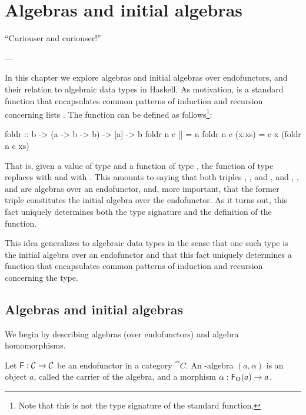 \chapter{Algebras and initial algebras}
\label{chap:algebras}

\epigraph{
  ``Curiouser and curiouser!''
}{---\textcite[23]{carroll-2004}}

In this chapter we explore algebras and initial algebras over
endofunctors, and their relation to algebraic data types in Haskell.
As motivation,  is a standard function that
encapsulates common patterns of induction and recursion concerning
lists \parencite[355--356]{hutton-1999}. The 
function can be defined as follows\footnote{Note that this is not the
  type signature of the standard  function.}:
\begin{codehaskell}
foldr :: b -> (a -> b -> b) -> [a] -> b
foldr n c []     = n
foldr n c (x:xs) = c x (foldr n c xs)
\end{codehaskell}
That is, given a value  of type  and a
function  of type , the
function  of type 
replaces \texthaskell{[]} with  and \texthaskell{(:)}
with . This amounts to saying that both triples
\texthaskell{[a]}, \texthaskell{[]}, and \texthaskell{(:)}, and
, , and  are algebras
over an endofunctor, and, more important, that the former triple
constitutes the initial algebra over the endofunctor. As it turns out,
this fact uniquely determines both the type signature and the
definition of the  function.

This idea generalizes to algebraic data types in the sense that one
such type is the initial algebra over an endofunctor and that this
fact uniquely determines a function that encapsulates common patterns
of induction and recursion concerning the type.

\section{Algebras and initial algebras}
\label{sec:algebras}

We begin by describing algebras (over endofunctors) and algebra
homomorphisms.

\begin{definition}
  \label{def:algebra}


  Let $\mathsf{F}: \mathcal{C} \to \mathcal{C}$ be an endofunctor in a category
  $\cat{C}$. An -algebra $(a,\alpha)$ is an object $a$, called
  the carrier of the algebra, and a morphism $\alpha: \mathsf{F}_{\operatorname{O}}(a) \to
  a$.

\end{definition}

